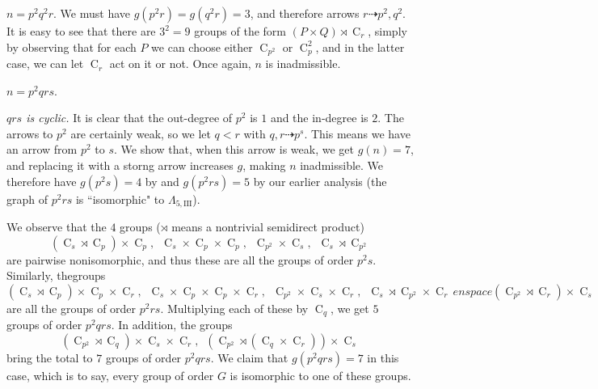 \documentclass{article}
\newenvironment{enumrealm}{\setlength{\abovedisplayskip}{5pt}
\setlength{\belowdisplayskip}{5pt}}{\setlength{\abovedisplayskip}{10.0pt plus 2.0pt minus 5.0pt}
\setlength{\belowdisplayskip}{10.0pt plus 2.0pt minus 5.0pt}}
\newcommand{\cyc}[1]{\operatorname{C}_{#1}}
\newcommand{\qlamd}{\Lambda_{5,\text{III}}}
\newcommand{\hthref}[1]{\hyperref[#1]{\thref{#1}}}
\theoremstyle{plain}
\theoremstyle{definition}
\begin{document}
 $n = p^2 q^2 r$.
We must have $g(p^2 r) = g(q^2 r) = 3$, and therefore arrows $r \dashrightarrow p^2, q^2$. It is easy to see that there are $3^2 = 9$ groups of the form $(P \times Q) \rtimes \cyc{r}$, simply by observing that for each $P$ we can choose either $\cyc{p^2}\text{ or }\cyc{p}^2$, and in the latter case, we can let $\cyc{r}$ act on it or not. Once again, $n$ is inadmissible.
 
 $n = p^2 q r s$.

 \emph{$qrs$ is cyclic.} It is clear that the out-degree of $p^2$ is $1$ and the in-degree is $2$. The arrows to $p^2$ are certainly weak, so we let $q < r$ with $q, r \dashrightarrow p^s$. This means we have an arrow from $p^2$ to $s$. We show that, when this arrow is weak, we get $g(n) = 7$, and replacing it with a storng arrow increases $g$, making $n$ inadmissible. We therefore  have $g(p^2 s) = 4$ by \hthref{euppq} and $g(p^2 r s) = 5$ by our earlier analysis (the graph of $p^2 r s$ is ``isomorphic" to $\qlamd$).

We observe that the $4$ groups ($\rtimes$ means a nontrivial semidirect product)\begin{enumrealm}\begin{equation*}(\cyc{s} \rtimes \cyc{p}) \times \cyc{p},\enspace
\cyc{s} \times \cyc{p} \times \cyc{p},\enspace
\cyc{p^2} \times \cyc{s},\enspace
\cyc{s} \rtimes \cyc{p^2}\end{equation*}\end{enumrealm} are pairwise nonisomorphic, and thus these are all the groups of order $p^2 s$. Similarly, the\nolinebreak[4] groups\begin{enumrealm}\begin{equation*}(\cyc{s} \rtimes \cyc{p}) \times \cyc{p} \times \cyc{r},\enspace
\cyc{s} \times \cyc{p} \times \cyc{p} \times \cyc{r},\enspace
\cyc{p^2} \times \cyc{s} \times \cyc{r},\enspace
\cyc{s} \rtimes \cyc{p^2} \times \cyc{r}\,enspace
(\cyc{p^2} \rtimes \cyc{r}) \times \cyc{s}\end{equation*}\end{enumrealm} are all the groups of order $p^2 r s$. Multiplying each of these by $\cyc{q}$, we get $5$ groups of order $p^2 q r s$. In addition, the groups\begin{enumrealm}
\begin{equation*}(\cyc{p^2} \rtimes \cyc{q}) \times \cyc{s} \times \cyc{r},\enspace
(\cyc{p^2} \rtimes (\cyc{q} \times \cyc{r})) \times \cyc{s}\end{equation*}\end{enumrealm}
bring the total to $7$ groups of order $p^2 q r s$. We claim that $g(p^2 q r s) = 7$ in this case, which is to say, every group of order $G$ is isomorphic to one of these groups.
\end{document}
